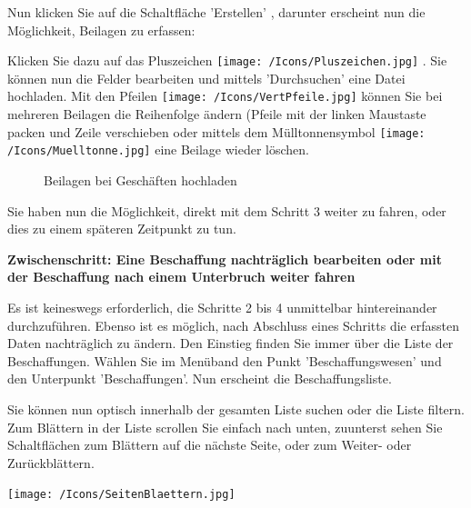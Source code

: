 \vspace{\baselineskip}

Nun klicken Sie auf die Schaltfläche 'Erstellen' , darunter erscheint nun die Möglichkeit, Beilagen zu
erfassen:

Klicken Sie dazu auf das Pluszeichen \texttt{[image: /Icons/Pluszeichen.jpg]} . Sie können nun die Felder bearbeiten  und mittels 'Durchsuchen'  eine Datei hochladen. Mit den Pfeilen \texttt{[image: /Icons/VertPfeile.jpg]}  können Sie bei mehreren Beilagen die Reihenfolge ändern (Pfeile mit der linken Maustaste packen und Zeile verschieben oder mittels dem Mülltonnensymbol \texttt{[image: /Icons/Muelltonne.jpg]}  eine Beilage wieder löschen.

\begin{figure}[H]
\caption{Beilagen bei Geschäften hochladen}
\end{figure}

Sie haben nun die Möglichkeit, direkt mit dem Schritt 3 weiter zu fahren, oder dies zu einem späteren Zeitpunkt zu tun.

\vspace{\baselineskip}

\textbf{Zwischenschritt: Eine Beschaffung nachträglich bearbeiten oder mit der Beschaffung nach einem
Unterbruch weiter fahren}

\vspace{\baselineskip}

Es ist keineswegs erforderlich, die Schritte 2 bis 4 unmittelbar hintereinander durchzuführen. Ebenso ist es möglich, nach Abschluss eines Schritts die erfassten Daten nachträglich zu ändern. Den Einstieg finden Sie immer über die Liste der Beschaffungen. Wählen Sie im Menüband den Punkt 'Beschaffungswesen' und den Unterpunkt 'Beschaffungen'. Nun erscheint die Beschaffungsliste.

\vspace{\baselineskip}

Sie können nun optisch innerhalb der gesamten Liste suchen oder die Liste filtern. Zum Blättern in der Liste scrollen Sie einfach nach unten, zuunterst sehen Sie Schaltflächen zum Blättern auf die nächste Seite, oder zum Weiter- oder Zurückblättern.

\begin{center}
\texttt{[image: /Icons/SeitenBlaettern.jpg]}
\end{center}

